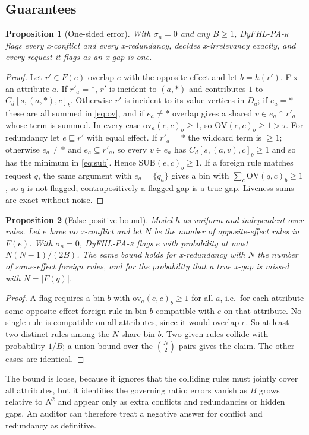 \documentclass[preprint,12pt]{elsarticle}
\newtheorem{proposition}{Proposition}
\theoremstyle{definition}
\newcommand{\name}{DyFHL-PA\xspace}
\newcommand{\R}{\textsc{r}}
\begin{document}
\subsection{Guarantees}
\begin{proposition}[One-sided error]
\label{prop:sound}
With $\sigma_{\!n}=0$ and any $B\ge1$, \name-\R{} flags every x-conflict and every x-redundancy, decides x-irrelevancy exactly, and every request it flags as an x-gap is one.
\end{proposition}
\begin{proof}
Let $r'\in F(e)$ overlap $e$ with the opposite effect and let $b=h(r')$. Fix an attribute $a$. If $r'_a=\ast$, $r'$ is incident to $(a,\ast)$ and contributes $1$ to $C_d[s,(a,\ast),\bar c]_b$. Otherwise $r'$ is incident to its value vertices in $D_a$; if $e_a=\ast$ these are all summed in \eqref{eq:ov}, and if $e_a\neq\ast$ overlap gives a shared $v\in e_a\cap r'_a$ whose term is summed. In every case $\mathrm{ov}_a(e,\bar c)_b\ge1$, so $\mathrm{OV}(e,\bar c)_b\ge1>\tau$. For redundancy let $e\sqsubseteq r'$ with equal effect. If $r'_a=\ast$ the wildcard term is $\ge1$; otherwise $e_a\neq\ast$ and $e_a\subseteq r'_a$, so every $v\in e_a$ has $C_d[s,(a,v),c]_b\ge1$ and so has the minimum in \eqref{eq:sub}. Hence $\mathrm{SUB}(e,c)_b\ge1$. If a foreign rule matches request $q$, the same argument with $e_a=\{q_a\}$ gives a bin with $\sum_c\mathrm{OV}(q,c)_b\ge1$, so $q$ is not flagged; contrapositively a flagged gap is a true gap. Liveness sums are exact without noise.
\end{proof}

\begin{proposition}[False-positive bound]
\label{prop:fp}
Model $h$ as uniform and independent over rules. Let $e$ have no x-conflict and let $N$ be the number of opposite-effect rules in $F(e)$. With $\sigma_{\!n}=0$, \name-\R{} flags $e$ with probability at most $N(N-1)/(2B)$. The same bound holds for x-redundancy with $N$ the number of same-effect foreign rules, and for the probability that a true x-gap is missed with $N=|F(q)|$.
\end{proposition}
\begin{proof}
A flag requires a bin $b$ with $\mathrm{ov}_a(e,\bar c)_b\ge1$ for all $a$, i.e.\ for each attribute some opposite-effect foreign rule in bin $b$ compatible with $e$ on that attribute. No single rule is compatible on all attributes, since it would overlap $e$. So at least two distinct rules among the $N$ share bin $b$. Two given rules collide with probability $1/B$; a union bound over the $\binom N2$ pairs gives the claim. The other cases are identical.
\end{proof}
The bound is loose, because it ignores that the colliding rules must jointly cover all attributes, but it identifies the governing ratio: errors vanish as $B$ grows relative to $N^2$ and appear only as extra conflicts and redundancies or hidden gaps. An auditor can therefore treat a negative answer for conflict and redundancy as definitive.
\end{document}
